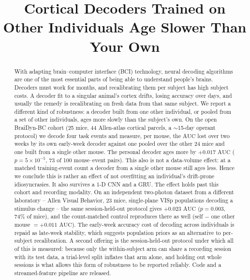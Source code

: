 \documentclass[mlabstract,onecolumn]{jmlr}
\title[Cortical Decoders Age Slower]{Cortical Decoders Trained on Other
Individuals Age Slower Than Your Own}
\author{\Name{Anonymous Author(s)}}
\newcommand{\auc}{\mathrm{AUC}}
\begin{document}
\maketitle

\begin{abstract}
With adapting brain--computer interface (BCI) technology, neural decoding algorithms are one of the
most essential parts of being able to understand people's brains. Decoders must work for months, and
recalibrating them per subject has high subject costs. A decoder fit to a singular animal's cortex
drifts, losing accuracy over days, and usually the remedy is recalibrating on fresh data from that
same subject. We report a different kind of robustness: a
decoder built from one other individual, or pooled from a set of other individuals, ages more slowly
than the subject's own. On the open BraiDyn-BC cohort (25 mice, 44 Allen-atlas cortical parcels, a
$\sim$15-day operant protocol) we decode four task events and measure, per mouse, the $\auc$ lost
over two weeks by its own early-week decoder against one pooled over the other 24 mice and one built
from a single other mouse. The personal decoder ages more by $+0.017$ $\auc$
($p = 5 \times 10^{-5}$, 73 of 100 mouse--event pairs). This also is not a data-volume effect: at a matched training-event count a
decoder from a single other mouse still ages less. Hence we conclude this is rather an effect of not
overfitting an individual's drift-prone idiosyncrasies. It also survives a 1-D CNN and a GRU. The
effect holds past this cohort and recording modality. On an independent two-photon dataset from a
different laboratory -- Allen Visual Behavior, 23 mice, single-plane VISp populations decoding a
stimulus change -- the same session-held-out protocol gives $+0.023$ $\auc$
($p = 0.003$, 74\% of mice), and the count-matched control reproduces there as well
(self $-$ one other mouse $= +0.011$ $\auc$). The
early-week accuracy cost of decoding across individuals is repaid as late-week stability, which
suggests population priors as an alternative to per-subject recalibration. A second offering is the
session-held-out protocol under which all of this is measured: because only the within-subject arm
can share a recording session with its test data, a trial-level split inflates that arm alone, and
holding out whole sessions is what allows this form of robustness to be reported reliably. Code and
a streamed-feature pipeline are released.
\end{abstract}
\end{document}
